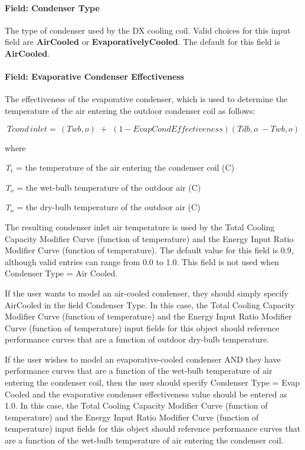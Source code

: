 \paragraph{Field: Condenser Type}\label{field-condenser-type-4}

The type of condenser used by the DX cooling coil. Valid choices for this input field are \textbf{AirCooled} or \textbf{EvaporativelyCooled}. The default for this field is \textbf{AirCooled}.

\paragraph{Field: Evaporative Condenser Effectiveness}\label{field-evaporative-condenser-effectiveness-1}

The effectiveness of the evaporative condenser, which is used to determine the temperature of the air entering the outdoor condenser coil as follows:

\begin{equation}
Tcond\,inlet = \,\left( {Twb,o} \right)\,\, + \,\,\left( {1 - EvapCondEffectiveness} \right)\left( {Tdb,o\,\, - Twb,o} \right)
\end{equation}

where

\emph{T\(_{t}\)} = the temperature of the air entering the condenser coil (C)

\emph{T\(_{o}\)} = the wet-bulb temperature of the outdoor air (C)

\emph{T\(_{o}\)} = the dry-bulb temperature of the outdoor air (C)

The resulting condenser inlet air temperature is used by the Total Cooling Capacity Modifier Curve (function of temperature) and the Energy Input Ratio Modifier Curve (function of temperature). The default value for this field is 0.9, although valid entries can range from 0.0 to 1.0. This field is not used when Condenser Type = Air Cooled.

If the user wants to model an air-cooled condenser, they should simply specify AirCooled in the field Condenser Type. In this case, the Total Cooling Capacity Modifier Curve (function of temperature) and the Energy Input Ratio Modifier Curve (function of temperature) input fields for this object should reference performance curves that are a function of outdoor dry-bulb temperature.

If the user wishes to model an evaporative-cooled condenser AND they have performance curves that are a function of the wet-bulb temperature of air entering the condenser coil, then the user should specify Condenser Type = Evap Cooled and the evaporative condenser effectiveness value should be entered as 1.0. In this case, the Total Cooling Capacity Modifier Curve (function of temperature) and the Energy Input Ratio Modifier Curve (function of temperature) input fields for this object should reference performance curves that are a function of the wet-bulb temperature of air entering the condenser coil.

